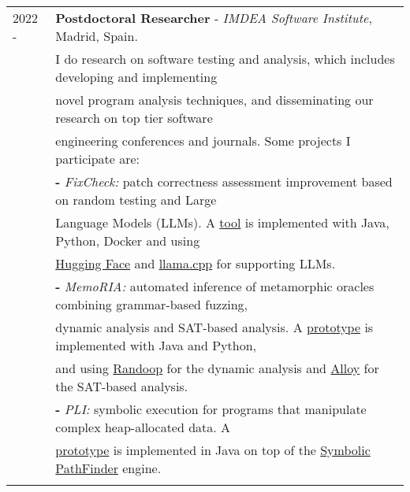 \documentclass[a4paper,10pt]{article} %
\begin{document}
\begin{longtable}{ll}
\\
2022 - & \textbf{Postdoctoral Researcher} - \textit{IMDEA Software Institute}, Madrid, Spain. \\
& I do research on software testing and analysis, which includes developing and implementing \\ 
& novel program analysis techniques, and disseminating our research on top tier software \\ 
& engineering  conferences and journals. Some projects I participate are: \\ 
& \textbf{-} \textit{FixCheck:} patch correctness assessment improvement based on random testing and Large \\
& Language Models (LLMs). A \href{https://github.com/facumolina/fixcheck}{tool} is implemented with Java, Python, Docker and using \\
& \href{https://huggingface.co/}{Hugging Face} and \href{https://github.com/ggerganov/llama.cpp}{llama.cpp} for supporting LLMs. \\
& \textbf{-} \textit{MemoRIA:} automated inference of metamorphic oracles combining grammar-based fuzzing, \\
& dynamic analysis and SAT-based analysis. A \href{https://zenodo.org/records/10683011}{prototype} is implemented with Java and Python, \\ 
& and using \href{https://randoop.github.io/randoop/}{Randoop} for the dynamic analysis and \href{https://alloytools.org/}{Alloy} for the SAT-based analysis. \\
& \textbf{-} \textit{PLI:} symbolic execution for programs that manipulate complex heap-allocated data. A \\ 
& \href{https://github.com/JuanmaCopia/spf-pli}{prototype} is implemented in Java on top of the \href{https://github.com/SymbolicPathFinder/jpf-symbc}{Symbolic PathFinder} engine. \\ & \\


\end{longtable}
\end{document}
